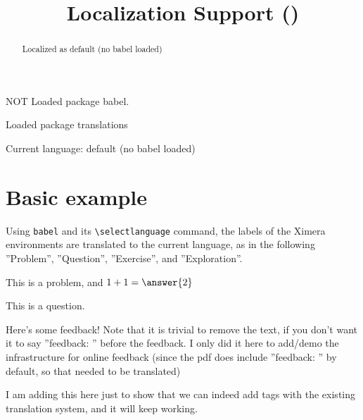\documentclass{ximera}
\title{Localization Support (\languagename)}
\providecommand{\languagename}{default (no babel loaded)}
\begin{document}
\begin{abstract}%
    Localized as \languagename
\end{abstract}
\maketitle

\makeatletter
{}       {\phantom{NOT }}{NOT } Loaded package babel.

 Loaded package translations

Current language: \languagename

\makeatother


\section*{Basic example}%

        Using \verb|babel| and its \verb|\selectlanguage| command, the labels of the Ximera environments are translated to the current language,
        as in the following ''Problem'', ''Question'', ''Exercise'', and ''Exploration''. 
        \begin{problem}%
            This is a problem, and $1+1 = \answer{2}$%
            \begin{multipleChoice}
            \end{multipleChoice}%
        \end{problem}
            
        \begin{question}
            This is a question.
            \begin{selectAll}
            \end{selectAll}%
            \begin{feedback}
                Here's some feedback! Note that it is trivial to remove the text, if you don't want it to say ''feedback: '' before the feedback. I only did it here to add/demo the infrastructure for online feedback (since the pdf does include ''feedback: '' by default, so that needed to be translated)%
            \end{feedback}
            \begin{feedback}[correct]
                I am adding this here just to show that we can indeed add tags with the existing translation system, and it will keep working.%
            \end{feedback}
        \end{question}
            
\end{document}
